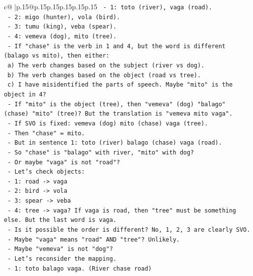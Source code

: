 \documentclass{article}
\begin{document}
{\begin{supertabular}{c@{$\;$}|p{.15\linewidth}@{}p{.15\linewidth}p{.15\linewidth}p{.15\linewidth}p{.15\linewidth}p{.15\linewidth}}
{{{\texttt{    {-} 1: toto (river), vaga (road).} \\
\texttt{    {-} 2: migo (hunter), vola (bird).} \\
\texttt{    {-} 3: tumu (king), veba (spear).} \\
\texttt{    {-} 4: vemeva (dog), mito (tree).} \\
\texttt{    {-} If "chase" is the verb in 1 and 4, but the word is different (balago vs mito), then either:} \\
\texttt{      a) The verb changes based on the subject (river vs dog).} \\
\texttt{      b) The verb changes based on the object (road vs tree).} \\
\texttt{      c) I have misidentified the parts of speech. Maybe "mito" is the object in 4?} \\
\texttt{      {-} If "mito" is the object (tree), then "vemeva" (dog) "balago" (chase) "mito" (tree)? But the translation is "vemeva mito vaga".} \\
\texttt{      {-} If SVO is fixed: vemeva (dog) mito (chase) vaga (tree).} \\
\texttt{      {-} Then "chase" = mito.} \\
\texttt{      {-} But in sentence 1: toto (river) balago (chase) vaga (road).} \\
\texttt{      {-} So "chase" is "balago" with river, "mito" with dog?} \\
\texttt{      {-} Or maybe "vaga" is not "road"?} \\
\texttt{      {-} Let's check objects:} \\
\texttt{        {-} 1: road {-}> vaga} \\
\texttt{        {-} 2: bird {-}> vola} \\
\texttt{        {-} 3: spear {-}> veba} \\
\texttt{        {-} 4: tree {-}> vaga? If vaga is road, then "tree" must be something else. But the last word is vaga.} \\
\texttt{        {-} Is it possible the order is different? No, 1, 2, 3 are clearly SVO.} \\
\texttt{        {-} Maybe "vaga" means "road" AND "tree"? Unlikely.} \\
\texttt{        {-} Maybe "vemeva" is not "dog"?} \\
\texttt{        {-} Let's reconsider the mapping.} \\
\texttt{        {-} 1: toto balago vaga. (River chase road)} \\
}}}
\end{supertabular}}
\end{document}

